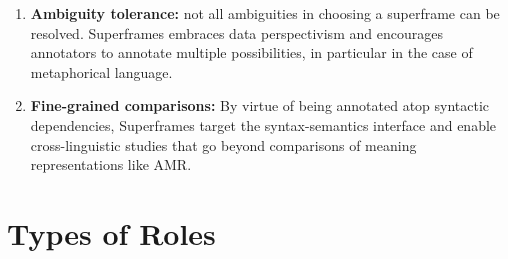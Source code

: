 \documentclass[a4paper]{article}
\begin{document}
\begin{enumerate}
    \item \textbf{Ambiguity tolerance:} not all ambiguities in choosing a superframe can be resolved. Superframes embraces data perspectivism \citep{basile-2020-end} and encourages annotators to annotate multiple possibilities, in particular in the case of metaphorical language.
    \item \textbf{Fine-grained comparisons:} By virtue of being annotated atop syntactic dependencies, Superframes target the syntax-semantics interface and enable cross-linguistic studies that go beyond comparisons of meaning representations like AMR.
\end{enumerate}


\clearpage
\section{Types of Roles}
\end{document}
